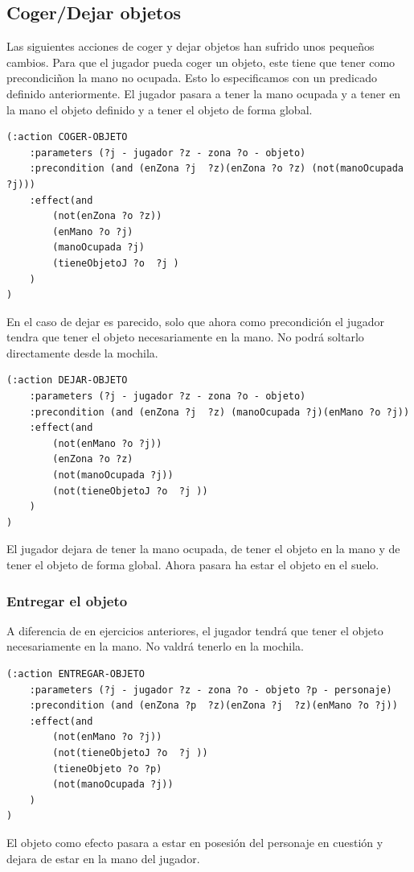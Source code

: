 \documentclass[12pt,a4paper]{article}
\begin{document}
\subsection{Coger/Dejar objetos}
Las siguientes acciones  de coger y dejar objetos han sufrido unos pequeños cambios. 
Para que el jugador pueda coger un objeto, este tiene que tener como precondiciñon la mano no ocupada. Esto lo especificamos con un predicado definido anteriormente. El jugador pasara a tener la mano ocupada y a tener en la mano el objeto definido y a tener el objeto de forma global.
\begin{lstlisting}
(:action COGER-OBJETO
	:parameters (?j - jugador ?z - zona ?o - objeto)
	:precondition (and (enZona ?j  ?z)(enZona ?o ?z) (not(manoOcupada  ?j)))
	:effect(and 
		(not(enZona ?o ?z))
		(enMano ?o ?j)
		(manoOcupada ?j)
		(tieneObjetoJ ?o  ?j )
	)
)
\end{lstlisting}
En el caso de dejar es parecido, solo que ahora como precondición el jugador tendra que tener el objeto necesariamente en la mano. No podrá soltarlo directamente desde la mochila. 
\begin{lstlisting}
(:action DEJAR-OBJETO
	:parameters (?j - jugador ?z - zona ?o - objeto)
	:precondition (and (enZona ?j  ?z) (manoOcupada ?j)(enMano ?o ?j))
	:effect(and 
		(not(enMano ?o ?j))
		(enZona ?o ?z)
		(not(manoOcupada ?j))
		(not(tieneObjetoJ ?o  ?j ))
	)
)
\end{lstlisting}
El jugador dejara de tener la mano ocupada, de tener el objeto en la mano y de tener el objeto de forma global. Ahora pasara ha estar el objeto en el suelo.
\subsubsection{Entregar el objeto}
A diferencia de en ejercicios anteriores, el jugador tendrá que tener el objeto necesariamente en la mano. No valdrá tenerlo en la mochila.
\begin{lstlisting}
(:action ENTREGAR-OBJETO
	:parameters (?j - jugador ?z - zona ?o - objeto ?p - personaje)
	:precondition (and (enZona ?p  ?z)(enZona ?j  ?z)(enMano ?o ?j))
	:effect(and 
		(not(enMano ?o ?j))
		(not(tieneObjetoJ ?o  ?j ))
		(tieneObjeto ?o ?p)
		(not(manoOcupada ?j))
	)
)
\end{lstlisting}
El objeto como efecto pasara a estar en posesión del personaje en cuestión y dejara de estar en la mano del jugador. 
\end{document}
